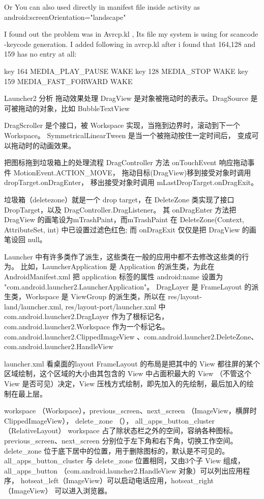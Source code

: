 \documentclass{book}
\begin{document}
\begin{CJK}{UTF8}{gbsn}
Or You can also used directly in manifest file inside activity as
 android:screenOrientation="landscape"


I found out the problem was in Avrcp.kl , Its file my system is using for scancode -keycode generation.
I added following in avrcp.kl after i found that 164,128 and 159  has no entry at all:

key 164   MEDIA_PLAY_PAUSE    WAKE
key 128   MEDIA_STOP          WAKE
key 159   MEDIA_FAST_FORWARD  WAKE

Launcher2 分析
拖动效果处理
DragView 是对象被拖动时的表示。DragSource 是可被拖动的对象，比如
BubbleTextView


DragScroller 是个接口，被 Workspace 实现，当拖到边界时，滚动到下一个
Workspace。 SymmetricalLinearTween
是当一个被拖动按住一定时间后， 变成可以拖动时的动画效果。




把图标拖到垃圾箱上的处理流程
DragController 方法 onTouchEvent 响应拖动事件
MotionEvent.ACTION_MOVE， 拖动目标(DragView)移到接受对象时调用
dropTarget.onDragEnter， 移出接受对象时调用 mLastDropTarget.onDragExit。

垃圾箱（deletezone）就是一个 drop target，在 DeleteZone 类实现了接口
DropTarget，以及 DragController.DragListener。 其 onDragEnter 方法把 
DragView 的画笔设为mTrashPaint，而mTrashPaint 在 DeleteZone(Context,
AttributeSet, int) 中已设置过滤色红色; 而 onDragExit 仅仅是把 DragView
的画笔设回 null。 

Launcher 中有许多类作了派生，这些类在一般的应用中都不去修改这些类的行为。
比如，LauncherApplication 是 Application 的派生类，为此在 AndroidManifest.xml 把
application 标签的属性 android:name 设置为 "com.android.launcher2.LauncherApplication"。
DragLayer 是 FrameLayout 的派生类，Workspace 是 ViewGroup 的派生类，所以在
res/layout-land/launcher.xml, res/layout-port/launcher.xml 中
com.android.launcher2.DragLayer 作为了根标记名， com.android.launcher2.Workspace
作为一个标记名。
com.android.launcher2.ClippedImageView 、com.android.launcher2.DeleteZone、 com.android.launcher2.HandleView

launcher.xml 看桌面的layout
FrameLayout 的布局是把其中的 View
都往屏的某个区域绘制，这个区域的大小由其包含的 View 中占面积最大的 View
（不管这个 View 是否可见）决定，View
压栈方式绘制，即先加入的先绘制，最后加入的绘制在最上层。

workspace （Workspace），previous_screen、next_screen （ImageView，横屏时ClippedImageView），
delete_zone （）， all_apps_button_cluster （RelativeLayout）
workspace 占了除状态栏之外的空间，容纳各种图标。previous_screen、next_screen
分别位于左下角和右下角，切换工作空间。 delete_zone
位于底下居中的位置，用于删除图标的，默认是不可见的。 all_apps_button_cluster
与 delete_zone 位置相同，又由3个子 View 组成， all_apps_button
（com.android.launcher2.HandleView 对象）可以列出应用程序，
hotseat_left（ImageView）可以启动电话应用，hotseat_right（ImageView） 可以进入浏览器。


\end{CJK}
\end{document}
